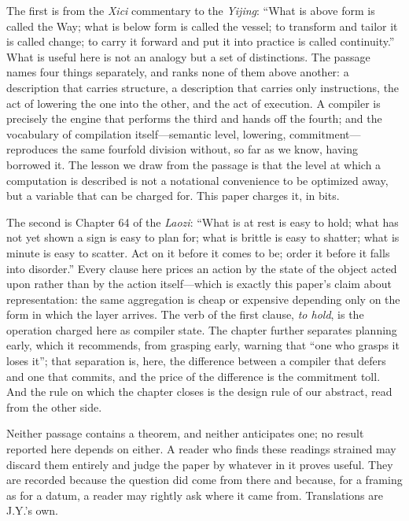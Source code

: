 \documentclass[a4paper,twocolumn,10pt,unpublished]{quantumarticle}
\begin{document}
\begin{acknowledgements}
The first is from the \emph{Xici} commentary to the \emph{Yijing}: ``What
is above form is called the Way; what is below form is called the vessel;
to transform and tailor it is called change; to carry it forward and put it
into practice is called continuity.''  What is useful here is not an
analogy but a set of distinctions.  The passage names four things
separately, and ranks none of them above another: a description that
carries structure, a description that carries only instructions, the act of
lowering the one into the other, and the act of execution.  A compiler is
precisely the engine that performs the third and hands off the fourth; and
the vocabulary of compilation itself---semantic level, lowering,
commitment---reproduces the same fourfold division without, so far as we
know, having borrowed it.  The lesson we draw from the passage is that
the level at which a computation is described is not a notational
convenience to be optimized away, but a variable that can be charged for.
This paper charges it, in bits.

The second is Chapter 64 of the \emph{Laozi}: ``What is at rest is easy to
hold; what has not yet shown a sign is easy to plan for; what is brittle is
easy to shatter; what is minute is easy to scatter.  Act on it before it
comes to be; order it before it falls into disorder.''  Every clause here
prices an action by the state of the object acted upon rather than by the
action itself---which is exactly this paper's claim about representation:
the same aggregation is cheap or expensive depending only on the form in
which the layer arrives.  The verb of the first clause, \emph{to hold}, is
the operation charged here as compiler state.  The chapter further
separates planning early, which it recommends, from grasping early, warning
that ``one who grasps it loses it''; that separation is,
here, the difference between a compiler that defers and one that commits,
and the price of the difference is the commitment toll.  And the rule on
which the chapter closes is the design rule of our abstract, read from the
other side.

Neither passage contains a theorem, and neither anticipates one; no result
reported here depends on either.  A reader who finds these readings
strained may discard them entirely and judge the paper by whatever in it
proves useful.  They are recorded because the question did come from there
and because, for a framing as for a datum, a reader may rightly ask where it
came from.  Translations are J.Y.'s own.
\fi


\end{acknowledgements}
\end{document}
